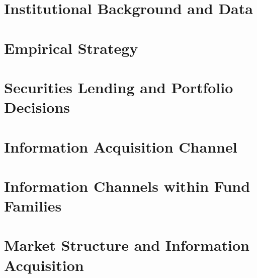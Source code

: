 \section{Institutional Background and Data}
\label{sec:institutional}


\section{Empirical Strategy}
\label{sec:empirical-strategy}


\section{Securities Lending and Portfolio Decisions}
\label{sec:main_results}


\section{Information Acquisition Channel}
\label{sec:information_channel}


\section{Information Channels within Fund Families}
\label{sec:family_channels}


\section{Market Structure and Information Acquisition}
\label{sec:market_structure}


